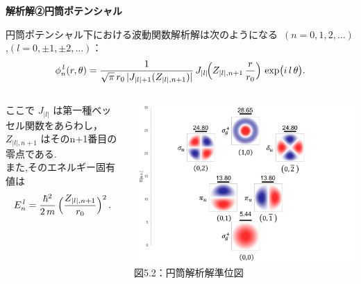 \documentclass{beamer}
\begin{document}
  \begin{frame}{}
    \textbf{解析解②\quad 円筒ポテンシャル}    

  円筒ポテンシャル下における波動関数解析解は次のようになる\ $(n = 0,1,2,\dots)$,$(l = 0,\pm1,\pm2,\dots)$：
     \vspace{-0.0em}  
  \begin{equation*}
  \phi_{n}^{\,l}(r,\theta)
  = \frac{1}{\sqrt{\pi}\,r_0\,\lvert J_{|l|+1}(Z_{|l|,n+1})\rvert}\,
  J_{|l|}\!\Bigl(Z_{|l|,n+1}\,\frac{r}{r_0}\Bigr)
  \,\exp\bigl(i\,l\,\theta\bigr).
  \end{equation*}
   \vspace{-2.5em}  
          \begin{columns}

          ここで $J_{|l|}$ は第一種ベッセル関数をあらわし，$Z_{|l|,n+1}$ はそのn+1番目の零点である.\\
          また,そのエネルギー固有値は
          \begin{equation*}
          E_{n}^{\,l} 
          = \frac{\hbar^2}{2\,m}\,\Bigl(\frac{Z_{|l|,n+1}}{r_0}\Bigr)^2\,.
          \end{equation*}


          \begin{center}
            \includegraphics[width=1.28\linewidth]{images/円筒準位図.png} \\
            \vspace{0.5em}
            {\small 図5.2：円筒解析解準位図}
          \end{center}
        \end{columns}



\end{frame}
\end{document}
